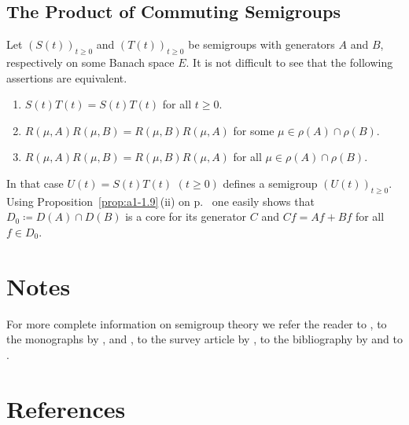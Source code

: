 \subsection{The Product of Commuting Semigroups}\label{subsec:a1-3.9}%
Let $(S(t))_{t\geq 0}$ and $(T(t))_{t\geq 0}$ be semigroups with generators $A$ and $B$, respectively on some Banach space $E$.
It is not difficult to see that the following assertions are equivalent.
\begin{enumerate}[\upshape (a)]

\item  
$S(t)T(t) = S(t)T(t)$ for all $t \geq 0$.

\item 
$R(\mu,A)R(\mu,B) = R(\mu,B)R(\mu,A)$ for some $\mu \in \rho(A) \cap \rho(B)$.

\item 
$R(\mu,A)R(\mu,B) = R(\mu,B)R(\mu,A)$ for all $\mu \in \rho(A) \cap \rho(B)$.

\end{enumerate}
In that case $U(t) = S(t)T(t)$ $(t \geq 0)$ defines a semigroup $(U(t))_{t\geq 0}$.
Using %
Proposition~\ref{prop:a1-1.9}\,(ii) on p.~\pageref{prop:a1-1.9} 
one easily shows that $D_{0} \coloneqq D(A) \cap D(B)$ is a core for its generator $C$ and $Cf = Af + Bf$ for all $f \in D_{0}$.

\section*{Notes}
%

For more complete information on semigroup theory we refer the reader to \citet{hillephillips:1957}, to the monographs by \citet{davies:1980}, 
\citet{goldstein:1985a} and \citet{pazy:1983}, to the survey article by \citet{kreinkhazan:1985}, to the bibliography by 
\citet{goldstein:1985b} and to \citet{engelnagel:2006}.

\section*{References}
{\RaggedRight
\renewcommand{\bibsection}{}

}